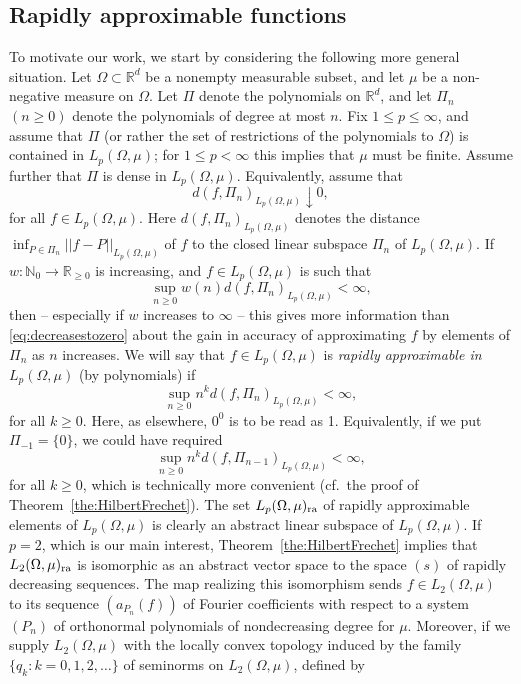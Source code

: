 \documentclass[12pt, reqno]{amsart}
\numberwithin{equation}{section}
\theoremstyle{plain}
\theoremstyle{definition}
\begin{document}
\subsection{Rapidly approximable functions}
To motivate our work, we start by considering the following more general situation. Let $\Omega\subset{{\mathbb R}}^d$ be a nonempty measurable subset, and let $\mu$ be a non-negative measure on $\Omega$. Let $\Pi$ denote the polynomials on ${{\mathbb R}}^d$, and let $\Pi_n$ $(n\geq 0)$ denote the polynomials of degree at most $n$. Fix $1\leq p\leq \infty$, and assume that $\Pi$ (or rather the set of restrictions of the polynomials to $\Omega$) is contained in $L_p(\Omega,\mu)$; for $1\leq p<\infty$ this implies that $\mu$ must be finite. Assume further that $\Pi$ is dense in $L_p(\Omega,\mu)$. Equivalently, assume that
\begin{equation}\label{eq:decreasestozero}
d(f,\Pi_n)_{L_p(\Omega,\mu)}\downarrow 0,
\end{equation}
for all $f\in L_p(\Omega,\mu)$. Here $d(f,\Pi_n)_{L_p(\Omega,\mu)}$ denotes the distance $\inf_{P\in\Pi_n}||f-P ||_{L_p(\Omega,\mu)}$ of $f$ to the closed linear subspace $\Pi_n$ of $L_p(\Omega,\mu)$. If $w:{{\mathbb N}}_0\to{{\mathbb R}}_{\geq 0}$ is increasing, and $f\in L_p(\Omega,\mu)$ is such that
\begin{equation*}
\sup_{n\geq 0} w(n)d(f,\Pi_n)_{L_p(\Omega,\mu)}<\infty,
\end{equation*}
then -- especially if $w$ increases to $\infty$ --  this gives more information than \eqref{eq:decreasestozero} about the gain in accuracy of approximating $f$ by elements of $\Pi_n$ as $n$ increases. We will say that $f\in L_p(\Omega,\mu)$ is \emph{rapidly approximable in $L_p(\Omega,\mu)$} (by polynomials) if
\begin{equation*}
\sup_{n\geq 0} n^k d(f,\Pi_n)_{L_p(\Omega,\mu)}<\infty,
\end{equation*}
for all $k\geq 0$. Here, as elsewhere, $0^0$ is to be read as 1. Equivalently, if we put $\Pi_{-1}=\{0\}$, we could have required
\begin{equation*}
\sup_{n\geq 0} n^k d(f,\Pi_{n-1})_{L_p(\Omega,\mu)}<\infty,
\end{equation*}
for all $k\geq 0$, which is technically more convenient (cf.\ the proof of Theorem~\ref{the:HilbertFrechet}). The set $L_p(\Omega,\mu)_{\textup{ra}}$ of rapidly approximable elements of $L_p(\Omega,\mu)$ is clearly an abstract linear subspace of $L_p(\Omega,\mu)$. If $p=2$, which is our main interest, Theorem~\ref{the:HilbertFrechet} implies that $L_2(\Omega,\mu)_{\textup{ra}}$ is isomorphic as an abstract vector space to the space $(s)$ of rapidly decreasing sequences. The map realizing this isomorphism sends $f\in L_2(\Omega,\mu)$ to its sequence ${({a_{P_n}(f)})}$ of Fourier coefficients with respect to a system ${({P_n})}$ of orthonormal polynomials of nondecreasing degree for $\mu$.  Moreover, if we supply $L_2(\Omega,\mu)$ with the locally convex topology induced by the family $\{q_k : k=0,1,2,\ldots\}$ of seminorms on $L_2(\Omega,\mu)$, defined by
\end{document}
